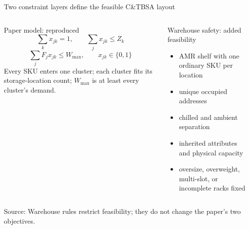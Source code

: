 \documentclass[aspectratio=169,10pt]{beamer}
\newcommand{\source}[1]{\vfill{\tiny\color{gray}Source: #1}}
\begin{document}
\begin{frame}{Two constraint layers define the feasible C\&TBSA layout}
  \begin{columns}[T,onlytextwidth]
    \begin{block}{Paper model: reproduced}
      \[
        \sum_k x_{jk}=1,\qquad
        \sum_j x_{jk}\le Z_k
      \]
      \[
        \sum_j F_jx_{jk}\le W_{\max},\qquad
        x_{jk}\in\{0,1\}
      \]
      \scriptsize
      Every SKU enters one cluster; each cluster fits its storage-location count;
      $W_{\max}$ is at least every cluster's demand.
    \end{block}
    \begin{alertblock}{Warehouse safety: added feasibility}
      \begin{itemize}
        \item AMR shelf with one ordinary SKU per location
        \item unique occupied addresses
        \item chilled and ambient separation
        \item inherited attributes and physical capacity
        \item oversize, overweight, multi-slot, or incomplete racks fixed
      \end{itemize}
    \end{alertblock}
  \end{columns}
  \vspace{0.3cm}
  \centering
  \source{Warehouse rules restrict feasibility; they do not change the paper's two objectives.}
\end{frame}
\end{document}
